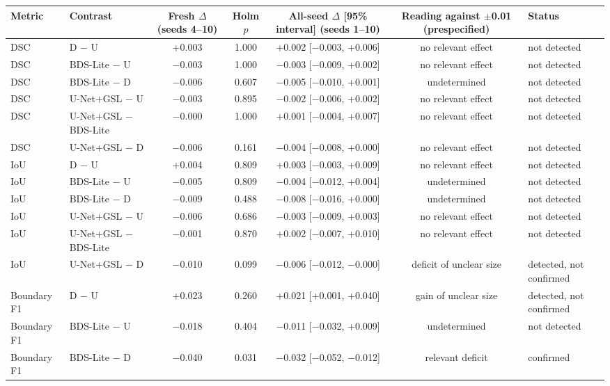 \begin{tabular}{llccccl}
\toprule
Metric & Contrast & Fresh $\Delta$ (seeds 4--10) & Holm $p$ & All-seed $\Delta$ [95\% interval] (seeds 1--10) & Reading against $\pm$0.01 (prespecified) & Status \\
\midrule
DSC & D $-$ U & +0.003 & 1.000 & +0.002 [$-$0.003, +0.006] & no relevant effect & not detected \\
DSC & BDS-Lite $-$ U & $-$0.003 & 1.000 & $-$0.003 [$-$0.009, +0.002] & no relevant effect & not detected \\
DSC & BDS-Lite $-$ D & $-$0.006 & 0.607 & $-$0.005 [$-$0.010, +0.001] & undetermined & not detected \\
DSC & U-Net+GSL $-$ U & $-$0.003 & 0.895 & $-$0.002 [$-$0.006, +0.002] & no relevant effect & not detected \\
DSC & U-Net+GSL $-$ BDS-Lite & $-$0.000 & 1.000 & +0.001 [$-$0.004, +0.007] & no relevant effect & not detected \\
DSC & U-Net+GSL $-$ D & $-$0.006 & 0.161 & $-$0.004 [$-$0.008, +0.000] & no relevant effect & not detected \\
\midrule
IoU & D $-$ U & +0.004 & 0.809 & +0.003 [$-$0.003, +0.009] & no relevant effect & not detected \\
IoU & BDS-Lite $-$ U & $-$0.005 & 0.809 & $-$0.004 [$-$0.012, +0.004] & undetermined & not detected \\
IoU & BDS-Lite $-$ D & $-$0.009 & 0.488 & $-$0.008 [$-$0.016, +0.000] & undetermined & not detected \\
IoU & U-Net+GSL $-$ U & $-$0.006 & 0.686 & $-$0.003 [$-$0.009, +0.003] & no relevant effect & not detected \\
IoU & U-Net+GSL $-$ BDS-Lite & $-$0.001 & 0.870 & +0.002 [$-$0.007, +0.010] & no relevant effect & not detected \\
IoU & U-Net+GSL $-$ D & $-$0.010 & 0.099 & $-$0.006 [$-$0.012, $-$0.000] & deficit of unclear size & detected, not confirmed \\
\midrule
Boundary F1 & D $-$ U & +0.023 & 0.260 & +0.021 [+0.001, +0.040] & gain of unclear size & detected, not confirmed \\
Boundary F1 & BDS-Lite $-$ U & $-$0.018 & 0.404 & $-$0.011 [$-$0.032, +0.009] & undetermined & not detected \\
Boundary F1 & BDS-Lite $-$ D & $-$0.040 & 0.031 & $-$0.032 [$-$0.052, $-$0.012] & relevant deficit & confirmed \\

\end{tabular}
